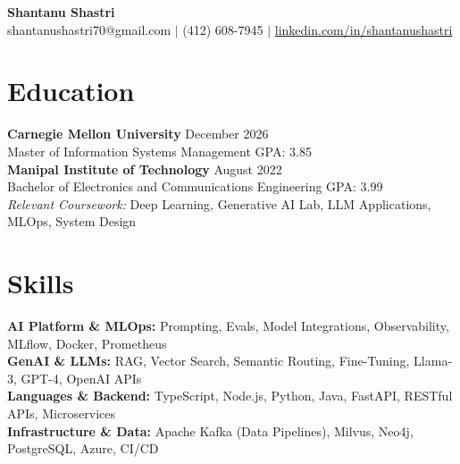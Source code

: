 \documentclass[11pt,a4paper]{article}
\begin{document}
\begin{center}
    \Huge \textbf{Shantanu Shastri} \\
    \vspace{2pt}
    \small shantanushastri70@gmail.com $|$ (412) 608-7945 $|$ \href{https://linkedin.com/in/shantanushastri}{linkedin.com/in/shantanushastri}
\end{center}

\vspace{-5pt}
\section{Education}
\noindent
\textbf{Carnegie Mellon University} \hfill December 2026 \\
Master of Information Systems Management \hfill GPA: 3.85 \\
\textbf{Manipal Institute of Technology} \hfill August 2022 \\
Bachelor of Electronics and Communications Engineering \hfill GPA: 3.99 \\
\textit{Relevant Coursework:} Deep Learning, Generative AI Lab, LLM Applications, MLOps, System Design

\vspace{-5pt}
\section{Skills}
\noindent
\textbf{AI Platform \& MLOps:} Prompting, Evals, Model Integrations, Observability, MLflow, Docker, Prometheus \\
\textbf{GenAI \& LLMs:} RAG, Vector Search, Semantic Routing, Fine-Tuning, Llama-3, GPT-4, OpenAI APIs \\
\textbf{Languages \& Backend:} TypeScript, Node.js, Python, Java, FastAPI, RESTful APIs, Microservices \\
\textbf{Infrastructure \& Data:} Apache Kafka (Data Pipelines), Milvus, Neo4j, PostgreSQL, Azure, CI/CD

\vspace{-5pt}
\end{document}
